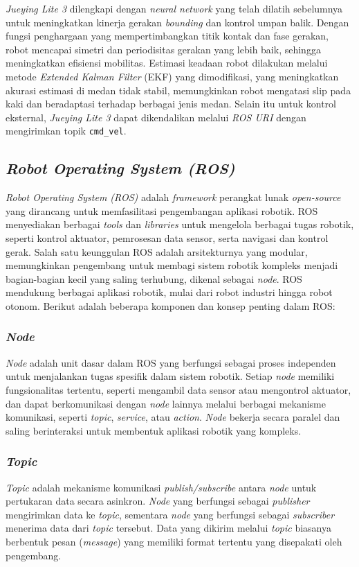 \emph{Jueying Lite 3} dilengkapi dengan \emph{neural network} yang telah dilatih sebelumnya untuk meningkatkan kinerja gerakan \emph{bounding} dan kontrol umpan balik. Dengan fungsi penghargaan yang mempertimbangkan titik kontak dan fase gerakan, robot mencapai simetri dan periodisitas gerakan yang lebih baik, sehingga meningkatkan efisiensi mobilitas. Estimasi keadaan robot dilakukan melalui metode \emph{Extended Kalman Filter} (EKF) yang dimodifikasi, yang meningkatkan akurasi estimasi di medan tidak stabil, memungkinkan robot mengatasi slip pada kaki dan beradaptasi terhadap berbagai jenis medan. Selain itu untuk kontrol eksternal, \emph{Jueying Lite 3} dapat dikendalikan melalui \emph{ROS URI} dengan mengirimkan topik \texttt{cmd\_vel}\cite{deep2024motion}.

\subsection{\emph{Robot Operating System (ROS)}}
\emph{Robot Operating System (ROS)} adalah \emph{framework} perangkat lunak \emph{open-source} yang dirancang untuk memfasilitasi pengembangan aplikasi robotik. ROS menyediakan berbagai \emph{tools} dan \emph{libraries} untuk mengelola berbagai tugas robotik, seperti kontrol aktuator, pemrosesan data sensor, serta navigasi dan kontrol gerak. Salah satu keunggulan ROS adalah arsitekturnya yang modular, memungkinkan pengembang untuk membagi sistem robotik kompleks menjadi bagian-bagian kecil yang saling terhubung, dikenal sebagai \emph{node}. ROS mendukung berbagai aplikasi robotik, mulai dari robot industri hingga robot otonom. Berikut adalah beberapa komponen dan konsep penting dalam ROS:

\subsubsection{\emph{Node}}
\emph{Node} adalah unit dasar dalam ROS yang berfungsi sebagai proses independen untuk menjalankan tugas spesifik dalam sistem robotik. Setiap \emph{node} memiliki fungsionalitas tertentu, seperti mengambil data sensor atau mengontrol aktuator, dan dapat berkomunikasi dengan \emph{node} lainnya melalui berbagai mekanisme komunikasi, seperti \emph{topic}, \emph{service}, atau \emph{action}. \emph{Node} bekerja secara paralel dan saling berinteraksi untuk membentuk aplikasi robotik yang kompleks.

\subsubsection{\emph{Topic}}
\emph{Topic} adalah mekanisme komunikasi \emph{publish/subscribe} antara \emph{node} untuk pertukaran data secara asinkron. \emph{Node} yang berfungsi sebagai \emph{publisher} mengirimkan data ke \emph{topic}, sementara \emph{node} yang berfungsi sebagai \emph{subscriber} menerima data dari \emph{topic} tersebut. Data yang dikirim melalui \emph{topic} biasanya berbentuk pesan (\emph{message}) yang memiliki format tertentu yang disepakati oleh pengembang.

